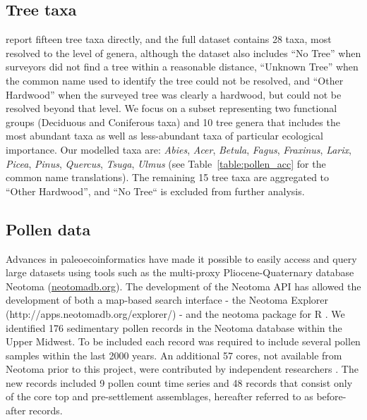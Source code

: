 \documentclass[12pt]{article}
\begin{document}
\subsection{Tree taxa}

\citet{goring_witness} report fifteen tree taxa directly, and the full
dataset contains 28 taxa, most resolved to the level of genera,
although the dataset also includes ``No Tree'' when surveyors did not
find a tree within a reasonable distance, ``Unknown Tree'' when the
common name used to identify the tree could not be resolved, and
``Other Hardwood'' when the surveyed tree was clearly a hardwood, but
could not be resolved beyond that level. We focus on a subset
representing two functional groups (Deciduous and Coniferous taxa) and
10 tree genera that includes the most abundant taxa as well as
less-abundant taxa of particular ecological importance. Our modelled
taxa are: \textit{Abies}, \textit{Acer}, \textit{Betula},
\textit{Fagus}, \textit{Fraxinus}, \textit{Larix}, \textit{Picea},
\textit{Pinus}, \textit{Quercus}, \textit{Tsuga}, \textit{Ulmus} (see
Table~\ref{table:pollen_acc} for the common name translations). The
remaining 15 tree taxa are aggregated to ``Other Hardwood'', and ``No
Tree`` is excluded from further analysis. 


\subsection{Pollen data}

Advances in paleoecoinformatics have made it possible to easily access
and query large datasets using tools such as the multi-proxy
Pliocene-Quaternary database Neotoma (\url{neotomadb.org}). The
development of the Neotoma API has allowed the development of both a
map-based search interface - the Neotoma Explorer
(http://apps.neotomadb.org/explorer/) - and the neotoma package for R
\citep{goring2015}. We identified 176 sedimentary pollen records in
the Neotoma database within the Upper Midwest. To be included each
record was required to include several pollen samples within the last
2000 years.  An additional 57 cores, not available from Neotoma prior
to this project, were contributed by independent researchers
\citep{kujawa2015}. The new records included 9 pollen count time
series and 48 records that consist only of the core top and
pre-settlement assemblages, hereafter referred to as before-after
records.
\end{document}
